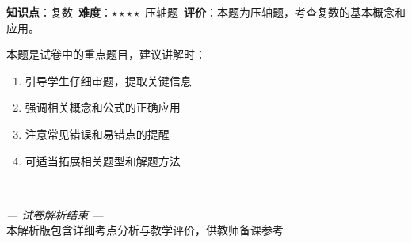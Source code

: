 \documentclass[10pt]{article}
\begin{document}
\begin{analysisbox}[考点分析]
\textbf{知识点}：复数\
\textbf{难度}：$\star\star\star\star$ 压轴题\
\textbf{评价}：本题为压轴题，考查复数的基本概念和应用。
\end{analysisbox}

\begin{tipbox}[教学提示]
本题是试卷中的重点题目，建议讲解时：
\begin{enumerate}
\item 引导学生仔细审题，提取关键信息
\item 强调相关概念和公式的正确应用
\item 注意常见错误和易错点的提醒
\item 可适当拓展相关题型和解题方法
\end{enumerate}
\end{tipbox}

\vfill
\begin{center}
\rule{0.5\textwidth}{0.4pt}\\[0.5em]
\textit{— 试卷解析结束 —}\\[0.3em]
\small 本解析版包含详细考点分析与教学评价，供教师备课参考
\end{center}
\end{document}
